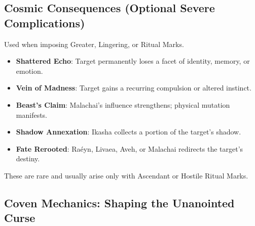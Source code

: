 \documentclass[11pt]{book}
\begin{document}
\subsection*{Cosmic Consequences (Optional Severe Complications)}

Used when imposing Greater, Lingering, or Ritual Marks.

\begin{itemize}[noitemsep]
    \item \textbf{Shattered Echo}: Target permanently loses a facet of identity, memory, or emotion.
    \item \textbf{Vein of Madness}: Target gains a recurring compulsion or altered instinct.
    \item \textbf{Beast's Claim}: Malachai's influence strengthens; physical mutation manifests.
    \item \textbf{Shadow Annexation}: Ikasha collects a portion of the target's shadow.
    \item \textbf{Fate Rerooted}: Raéyn, Livaea, Aveh, or Malachai redirects the target's destiny.
\end{itemize}

These are rare and usually arise only with Ascendant or Hostile Ritual Marks.

\subsection*{Coven Mechanics: Shaping the Unanointed Curse}
\end{document}
